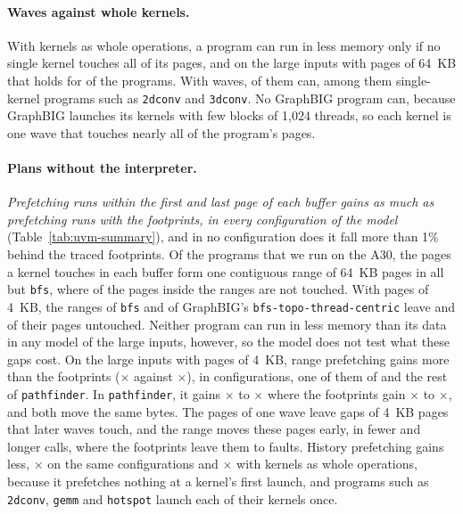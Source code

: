 \documentclass[11pt]{article}
\newcommand{\tabref}[1]{Table~\ref{#1}}
\newcommand{\code}[1]{\texttt{#1}}
\begin{document}
\paragraph{Waves against whole kernels.} With kernels as whole operations, a program can run in less memory only
if no single kernel touches all of its pages, and on the large inputs with pages of 64~KB that holds for
\numUvmKLargeOver{} of the \numUvmKLargePrograms{} programs. With waves, \numUvmWLargeOver{} of them can, among them
single-kernel programs such as \code{2dconv} and \code{3dconv}. No GraphBIG program can, because GraphBIG launches
its kernels with few blocks of 1{,}024 threads, so each kernel is one wave that touches nearly all of the program's
pages.

\paragraph{Plans without the interpreter.} \textit{Prefetching runs within the first and last page of each buffer
gains as much as prefetching runs with the footprints, in every configuration of the model}
(\tabref{tab:uvm-summary}), and in no configuration does it fall more than 1\% behind the traced footprints. Of the
\numUvmGapSpanPrograms{} programs that we run on the A30, the pages a kernel touches in each buffer form one
contiguous range of 64~KB pages in all but \code{bfs}, where \numUvmGapBfsSixtyFour{} of the pages inside the ranges
are not touched. With pages of 4~KB, the ranges of \code{bfs} and of GraphBIG's \code{bfs-topo-thread-centric} leave
\numUvmGapBfsFour{} and \numUvmGapGraphBfsFour{} of their pages untouched. Neither program can run in less memory
than its data in any model of the large inputs, however, so the model does not test what these gaps cost. On the
large inputs with pages of 4~KB, range prefetching gains more than the footprints
(\numUvmWLargeFourRangeMin{}$\times$ against \numUvmWLargeFourTrMin{}$\times$), in \numUvmWLargeFourRangeMinAhead{}
configurations, one of them of \code{\numUvmRangeAheadOther{}} and the rest of \code{pathfinder}. In \code{pathfinder}, it gains
\numUvmPathRangeMinLo{}$\times$ to \numUvmPathRangeMinHi{}$\times$ where the footprints gain
\numUvmPathTrMinLo{}$\times$ to \numUvmPathTrMinHi{}$\times$, and both move the same bytes. The pages of one wave
leave gaps of 4~KB pages that later waves touch, and the range moves these pages early, in fewer and longer calls,
where the footprints leave them to faults. History prefetching gains less, \numUvmWLargeFourHistMin{}$\times$ on
the same configurations and \numUvmKLargeHistMin{}$\times$ with kernels as whole operations, because it
prefetches nothing at a kernel's first launch, and programs such as \code{2dconv}, \code{gemm} and \code{hotspot}
launch each of their kernels once.
\end{document}
